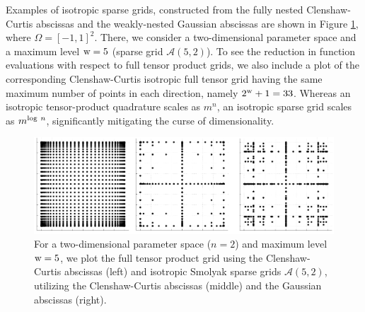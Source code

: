 Examples of isotropic sparse grids, constructed from the fully nested 
Clenshaw-Curtis abscissas %
and the weakly-nested Gaussian abscissas %
are shown in Figure \ref{fig:isogrid_N2_q7}, where $\Omega=[-1,1]^2$.
There, we consider a two-dimensional parameter space and a maximum level 
${\rm w}=5$ (sparse grid $\mathscr{A}(5,2)$).  To see the reduction in 
function evaluations with respect to full tensor product grids, we also 
include a plot of the corresponding Clenshaw-Curtis isotropic full tensor 
grid having the same maximum number of points in each direction, namely 
$2^{\rm w}+1 = 33$.  Whereas an isotropic tensor-product quadrature scales
as $m^n$, an isotropic sparse grid scales as $m^{{\rm log}~n}$, 
significantly mitigating the curse of dimensionality.
%
\begin{figure}[h!]
\begin{center}
\includegraphics[width=6.5in]{images/isogrid_N2_q6}
\caption{For a two-dimensional parameter space ($n=2$) and maximum level
  ${\rm w}=5$, we plot the full tensor product grid using the Clenshaw-Curtis
  abscissas (left) and isotropic Smolyak sparse grids
  $\mathscr{A}(5,2)$, utilizing the Clenshaw-Curtis abscissas (middle)
  and the Gaussian abscissas (right).} %
\label{fig:isogrid_N2_q7}
\end{center}
\end{figure}

